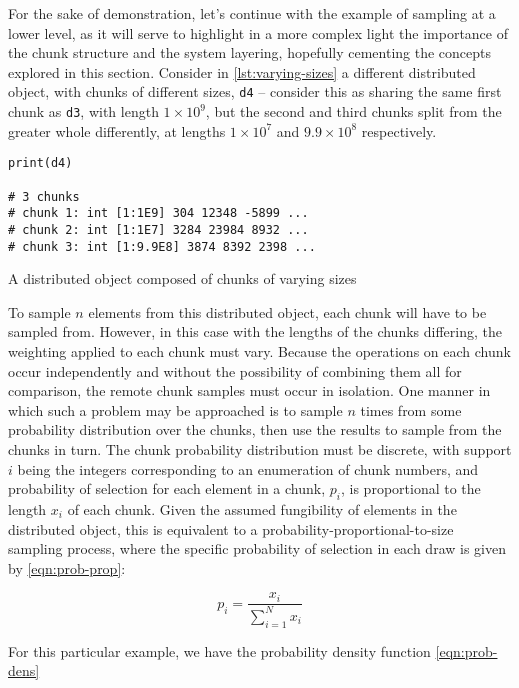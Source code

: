 For the sake of demonstration, let's continue with the example of
sampling at a lower level, as it will serve to highlight in a more
complex light the importance of the chunk structure and the system
layering, hopefully cementing the concepts explored in this section.
Consider in \ref{lst:varying-sizes} a different distributed object, with chunks of different sizes,
\texttt{d4} -- consider this as sharing the same first chunk as
\texttt{d3}, with length \(1 \times 10^9\), but the second and third
chunks split from the greater whole differently, at lengths
\(1 \times 10^7\) and \(9.9 \times 10^8\) respectively.

\begin{listing}
    \begin{verbatim}
print(d4)

# 3 chunks
# chunk 1: int [1:1E9] 304 12348 -5899 ...
# chunk 2: int [1:1E7] 3284 23984 8932 ...
# chunk 3: int [1:9.9E8] 3874 8392 2398 ...
    \end{verbatim}
    \caption{A distributed object composed of chunks of varying sizes}
    \label{lst:varying-sizes}
\end{listing}

To sample \(n\) elements from this distributed object, each chunk will
have to be sampled from. However, in this case with the lengths of the
chunks differing, the weighting applied to each chunk must vary. Because
the operations on each chunk occur independently and without the
possibility of combining them all for comparison, the remote chunk
samples must occur in isolation. One manner in which such a problem may
be approached is to sample \(n\) times from some probability
distribution over the chunks, then use the results to sample from the
chunks in turn. The chunk probability distribution must be discrete,
with support \(i\) being the integers corresponding to an enumeration of
chunk numbers, and probability of selection for each element in a chunk,
\(p_i\), is proportional to the length \(x_i\) of each chunk. Given the
assumed fungibility of elements in the distributed object, this is
equivalent to a probability-proportional-to-size sampling process, where
the specific probability of selection in each draw is given by \ref{eqn:prob-prop}:

\begin{equation}\label{eqn:prob-prop}
    p_i = \frac{x_i}{\sum_{i=1}^{N}x_i}
\end{equation}

For this particular example, we have the probability density
function \ref{eqn:prob-dens}


